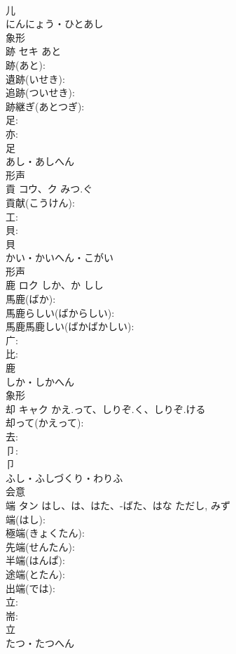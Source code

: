 \documentclass[8pt]{extreport}
\begin{document}
\begin{CJK}{UTF8}{min}
\\	儿	
\\	にんにょう・ひとあし	
\\	象形 
\\	跡	セキ	あと		
\\	跡(あと): 
\\	遺跡(いせき): 
\\	追跡(ついせき): 
\\	跡継ぎ(あとつぎ): 
\\	足: 
\\	亦: 
\\	足	
\\	あし・あしへん	
\\	形声 
\\	貢	コウ、ク	みつ.ぐ		
\\	貢献(こうけん): 
\\	工: 
\\	貝: 
\\	貝	
\\	かい・かいへん・こがい	
\\	形声 
\\	鹿	ロク	しか、か	しし	
\\	馬鹿(ばか): 
\\	馬鹿らしい(ばからしい): 
\\	馬鹿馬鹿しい(ばかばかしい): 
\\	广: 
\\	比: 
\\	鹿	
\\	しか・しかへん	
\\	象形 
\\	却	キャク	かえ.って、しりぞ.く、しりぞ.ける		
\\	却って(かえって): 
\\	去: 
\\	卩: 
\\	卩	
\\	ふし・ふしづくり・わりふ	
\\	会意 
\\	端	タン	はし、は、はた、-ばた、はな	ただし, みず	
\\	端(はし): 
\\	極端(きょくたん): 
\\	先端(せんたん): 
\\	半端(はんぱ): 
\\	途端(とたん): 
\\	出端(では): 
\\	立: 
\\	耑: 
\\	立	
\\	たつ・たつへん	

\end{CJK}
\end{document}
